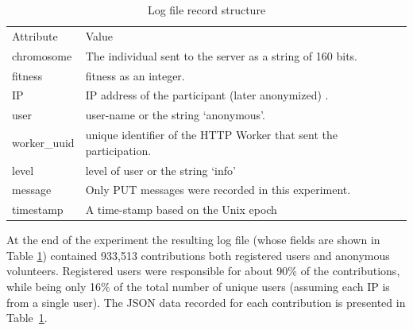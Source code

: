 \documentclass{llncs}
\begin{document}
\begin{table}[h!tbp]
  \small
  \caption{ Log file record structure}
  \label{tab:record}
  \centering
  \small
  \begin{tabular}{l  l}
    \hline\noalign{\smallskip}
    Attribute & Value \\
    \noalign{\smallskip}\hline\noalign{\smallskip}
    chromosome   & The individual sent to the server as a string of 160 bits.  \\ \hline
    fitness & fitness as an integer.  \\ \hline
    IP & IP address of the participant (later anonymized) .\\ \hline
    user & user-name or the string `anonymous'.  \\ \hline
    worker\_uuid & unique identifier of the HTTP Worker that sent the participation.   \\ \hline
    level &  level of user or the string `info' \\ \hline
    message & Only PUT messages were recorded in this experiment. \\ \hline
    timestamp & A time-stamp based on the Unix epoch\\ \hline
  \end{tabular}
\end{table}
%
At the end of the experiment the resulting log file (whose fields are shown in Table \ref{tab:record}) contained 933,513 contributions both
registered users and anonymous volunteers. Registered users were responsible for about
90\% of the contributions, while being only 16\% of the total number of unique users (assuming each IP is from a single user).
The JSON data recorded for each contribution is  presented
in Table~\ref{tab:record}.
\end{document}
